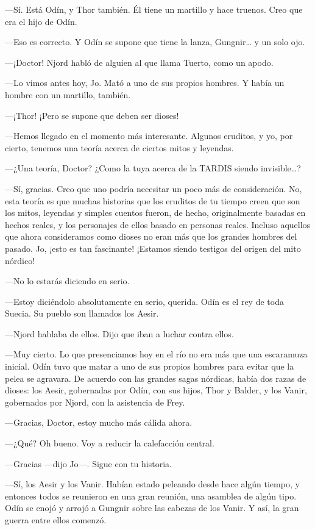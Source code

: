 ---Sí. Está Odín, y Thor también. Él tiene un martillo y hace truenos.
Creo que era el hijo de Odín.

---Eso es correcto. Y Odín se supone que tiene la lanza, Gungnir\ldots{}
y un solo ojo.

---¡Doctor! Njord habló de alguien al que llama Tuerto, como un apodo.

---Lo vimos antes hoy, Jo. Mató a uno de sus propios hombres. Y había un
hombre con un martillo, también.

---¡Thor! ¡Pero se supone que deben ser dioses!

---Hemos llegado en el momento más interesante. Algunos eruditos, y yo,
por cierto, tenemos una teoría acerca de ciertos mitos y leyendas.

---¿Una teoría, Doctor? ¿Como la tuya acerca de la TARDIS siendo
invisible\ldots{}?

---Sí, gracias. Creo que uno podría necesitar un poco más de
consideración. No, esta teoría es que muchas historias que los eruditos
de tu tiempo creen que son los mitos, leyendas y simples cuentos fueron,
de hecho, originalmente basadas en hechos reales, y los personajes de
ellos basado en personas reales. Incluso aquellos que ahora consideramos
como dioses no eran más que los grandes hombres del pasado. Jo, ¡esto es
tan fascinante! ¡Estamos siendo testigos del origen del mito nórdico!

---No lo estarás diciendo en serio.

---Estoy diciéndolo absolutamente en serio, querida. Odín es el rey de
toda Suecia. Su pueblo son llamados los Aesir.

---Njord hablaba de ellos. Dijo que iban a luchar contra ellos.

---Muy cierto. Lo que presenciamos hoy en el río no era más que una
escaramuza inicial. Odín tuvo que matar a uno de sus propios hombres
para evitar que la pelea se agravara. De acuerdo con las grandes sagas
nórdicas, había dos razas de dioses: los Aesir, gobernadas por Odín, con
sus hijos, Thor y Balder, y los Vanir, gobernados por Njord, con la
asistencia de Frey.

---Gracias, Doctor, estoy mucho más cálida ahora.

---¿Qué? Oh bueno. Voy a reducir la calefacción central.

---Gracias ---dijo Jo---. Sigue con tu historia.

---Sí, los Aesir y los Vanir. Habían estado peleando desde hace algún
tiempo, y entonces todos se reunieron en una gran reunión, una asamblea
de algún tipo. Odín se enojó y arrojó a Gungnir sobre las cabezas de los
Vanir. Y así, la gran guerra entre ellos comenzó.

